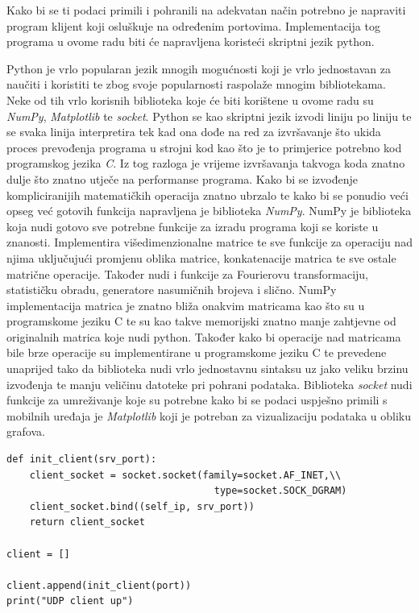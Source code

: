 \documentclass[times, utf8, diplomski]{fer}
\begin{document}
Kako bi se ti podaci primili i pohranili na adekvatan način potrebno je napraviti program klijent koji osluškuje na određenim portovima. Implementacija tog programa 
u ovome radu biti će napravljena koristeći skriptni jezik python. 

Python je vrlo popularan jezik mnogih mogućnosti koji je vrlo jednostavan za naučiti i koristiti te zbog svoje popularnosti raspolaže mnogim bibliotekama.
Neke od tih vrlo korisnih biblioteka koje će biti korištene u ovome radu su \textit{NumPy}, \textit{Matplotlib} te \textit{socket}. Python se kao skriptni jezik
izvodi liniju po liniju te se svaka linija interpretira tek kad ona dođe na red za izvršavanje što ukida proces prevođenja programa u strojni kod kao što je to primjerice
potrebno kod programskog jezika \textit{C}. Iz tog razloga je vrijeme izvršavanja takvoga koda znatno dulje što znatno utječe na performanse programa. Kako bi se
izvođenje kompliciranijih matematičkih operacija znatno ubrzalo te kako bi se ponudio veći opseg već gotovih funkcija napravljena je biblioteka \textit{NumPy}.
NumPy je biblioteka koja nudi gotovo sve potrebne funkcije za izradu programa koji se koriste u znanosti. Implementira višedimenzionalne matrice te sve funkcije
za operaciju nad njima uključujući promjenu oblika matrice, konkatenacije matrica te sve ostale matrične operacije. Također nudi i funkcije za Fourierovu transformaciju, statističku obradu,
generatore nasumičnih brojeva i slično. NumPy implementacija matrica je znatno bliža onakvim matricama kao što su u programskome jeziku C te su kao takve memorijski
znatno manje zahtjevne od originalnih matrica koje nudi python. Također kako bi operacije nad matricama bile brze operacije su implementirane u programskome jeziku C te
prevedene unaprijed tako da biblioteka nudi vrlo jednostavnu sintaksu uz jako veliku brzinu izvođenja te manju veličinu datoteke pri pohrani podataka.
Biblioteka \textit{socket} nudi funkcije za umreživanje koje su potrebne kako bi se podaci uspješno primili s mobilnih uređaja je \textit{Matplotlib} koji je potreban
za vizualizaciju podataka u obliku grafova.

\begin{lstlisting}[caption=Ostvarivanje veze na strani klijenta, label=socket]
def init_client(srv_port):
    client_socket = socket.socket(family=socket.AF_INET,\\
                                    type=socket.SOCK_DGRAM)
    client_socket.bind((self_ip, srv_port))
    return client_socket

client = []

client.append(init_client(port))
print("UDP client up") 
\end{lstlisting}
\end{document}

